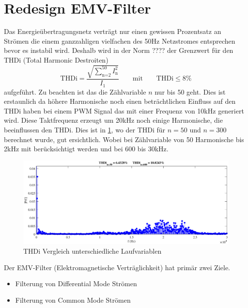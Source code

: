 \section{Redesign EMV-Filter}
\label{chapter_RedesignEMV}

Das Energieübertragungsnetz verträgt nur einen gewissen Prozentsatz an Strömen die einem ganzzahligen vielfachen des 50Hz Netzstromes entsprechen bevor es instabil wird. 
Deshalb wird in der Norm ???? der Grenzwert für den THDi (Total Harmonic Destroiten)
\begin{equation}
\text{THDi}=\dfrac{\sqrt{\sum\limits_\text{n=2}^{50} I^{2}_\text{n}}}{I_{1}}  \qquad\text{mit}\qquad \text{THDi} \leq \text{8\%}
\end{equation}
aufgeführt.
Zu beachten ist das die Zählvariable $n$ nur bis 50 geht.
Dies ist erstaunlich da höhere Harmonische noch einen beträchtlichen Einfluss auf den THDi haben bei einem PWM Signal das mit einer Frequenz von 10kHz generiert wird.
Diese Taktfrequenz erzeugt um 20kHz noch einige Harmonische, die beeinflussen den THDi. 
Dies ist in \ref{fig:THDiverg}, wo der THDi für $n=50$ und $n=300$ berechnet wurde, gut ersichtlich.
Wobei bei Zählvariable von 50 Harmonische bis 2kHz mit berücksichtigt werden und bei 600 bis 30kHz.
\begin{figure}[h!]
\begin{center}
	\includegraphics[width=\linewidth, height=0.25\textheight]{images/THDi_vergleich.eps}
	\caption{THDi Vergleich unterschiedliche Laufvariablen}
	\label{fig:THDiverg}
\end{center} 
\end{figure}

Der EMV-Filter (Elektromagnetische Verträglichkeit) hat primär zwei Ziele.

\begin{itemize}
	\item Filterung von Differential Mode Strömen
	\item Filterung von Common Mode Strömen
\end{itemize}

